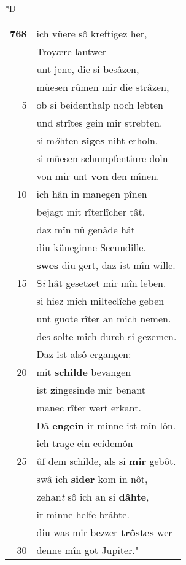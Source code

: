 \documentclass[8pt,a4paper,notitlepage]{article}
\begin{document}
\begin{table}[ht]
\begin{minipage}[t]{0.5\linewidth}
\small
\begin{center}*D
\end{center}
\begin{tabular}{rl}
\textbf{768} & ich vüere sô kreftigez her,\\ 
 & Troyære lantwer\\ 
 & unt jene, die si besâzen,\\ 
 & müesen rûmen mir die strâzen,\\ 
5 & ob si beidenthalp noch lebten\\ 
 & und strîtes gein mir strebten.\\ 
 & si m\textit{ö}hten \textbf{siges} niht erholn,\\ 
 & si müesen schumpfentiure doln\\ 
 & von mir unt \textbf{von} den mînen.\\ 
10 & ich hân in manegen pînen\\ 
 & bejagt mit rîterlîcher tât,\\ 
 & daz mîn nû genâde hât\\ 
 & diu küneginne Secundille.\\ 
 & \textbf{swes} diu gert, daz ist mîn wille.\\ 
15 & S\textit{i} hât gesetzet mir mîn leben.\\ 
 & si hiez mich milteclîche geben\\ 
 & unt guote rîter an mich nemen.\\ 
 & des solte mich durch si gezemen.\\ 
 & Daz ist alsô ergangen:\\ 
20 & mit \textbf{schilde} bevangen\\ 
 & ist \textbf{z}ingesinde mir benant\\ 
 & manec rîter wert erkant.\\ 
 & Dâ \textbf{engein} ir minne ist mîn lôn.\\ 
 & ich trage ein ecidemôn\\ 
25 & ûf dem schilde, als si \textbf{mir} gebôt.\\ 
 & swâ ich \textbf{sider} kom in nôt,\\ 
 & zehan\textit{t} sô ich an si \textbf{dâhte},\\ 
 & ir minne helfe brâhte.\\ 
 & diu was mir bezzer \textbf{trôstes} wer\\ 
30 & denne mîn got Jupiter."\\ 

\end{tabular}
\end{minipage}
\end{table}
\end{document}
